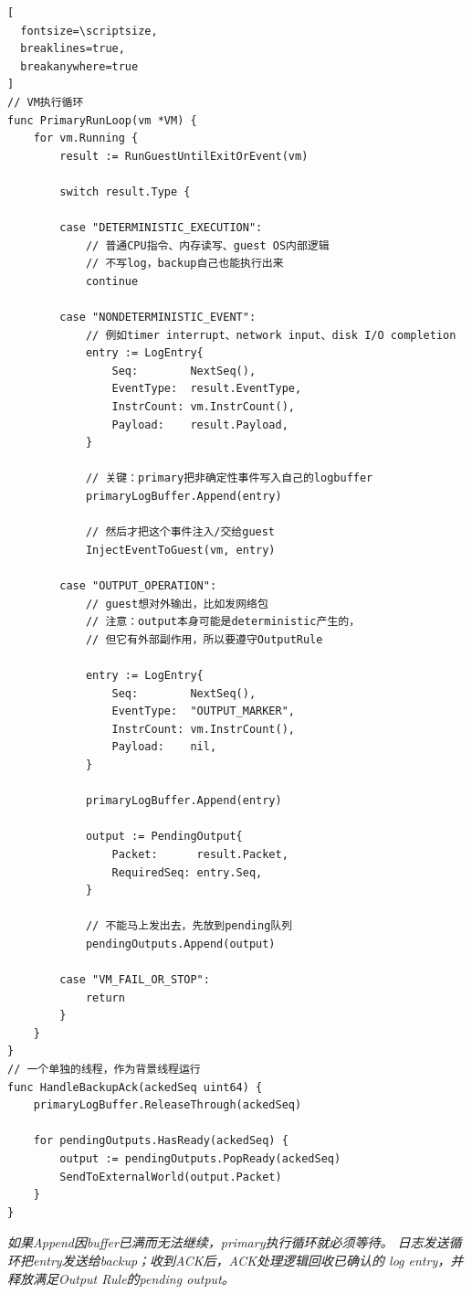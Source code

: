 \begin{Verbatim}[
  fontsize=\scriptsize,
  breaklines=true,
  breakanywhere=true
]
// VM执行循环
func PrimaryRunLoop(vm *VM) {
    for vm.Running {
        result := RunGuestUntilExitOrEvent(vm)

        switch result.Type {

        case "DETERMINISTIC_EXECUTION":
            // 普通CPU指令、内存读写、guest OS内部逻辑
            // 不写log，backup自己也能执行出来
            continue

        case "NONDETERMINISTIC_EVENT":
            // 例如timer interrupt、network input、disk I/O completion
            entry := LogEntry{
                Seq:        NextSeq(),
                EventType:  result.EventType,
                InstrCount: vm.InstrCount(),
                Payload:    result.Payload,
            }

            // 关键：primary把非确定性事件写入自己的logbuffer
            primaryLogBuffer.Append(entry)

            // 然后才把这个事件注入/交给guest
            InjectEventToGuest(vm, entry)

        case "OUTPUT_OPERATION":
            // guest想对外输出，比如发网络包
            // 注意：output本身可能是deterministic产生的，
            // 但它有外部副作用，所以要遵守OutputRule

            entry := LogEntry{
                Seq:        NextSeq(),
                EventType:  "OUTPUT_MARKER",
                InstrCount: vm.InstrCount(),
                Payload:    nil,
            }

            primaryLogBuffer.Append(entry)

            output := PendingOutput{
                Packet:      result.Packet,
                RequiredSeq: entry.Seq,
            }

            // 不能马上发出去，先放到pending队列
            pendingOutputs.Append(output)

        case "VM_FAIL_OR_STOP":
            return
        }
    }
}
// 一个单独的线程，作为背景线程运行
func HandleBackupAck(ackedSeq uint64) {
    primaryLogBuffer.ReleaseThrough(ackedSeq)

    for pendingOutputs.HasReady(ackedSeq) {
        output := pendingOutputs.PopReady(ackedSeq)
        SendToExternalWorld(output.Packet)
    }
}
\end{Verbatim}
\emph{如果Append因buffer已满而无法继续，primary执行循环就必须等待。%
日志发送循环把entry发送给backup；收到ACK后，ACK处理逻辑回收已确认的%
log entry，并释放满足Output Rule的pending output。}

